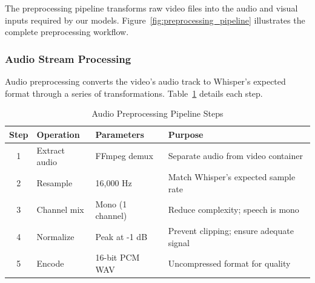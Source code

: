 The preprocessing pipeline transforms raw video files into the audio and visual inputs required by our models. Figure~\ref{fig:preprocessing_pipeline} illustrates the complete preprocessing workflow.

%
%

\subsubsection{Audio Stream Processing}

Audio preprocessing converts the video's audio track to Whisper's expected format through a series of transformations. Table~\ref{tab:audio_preprocessing} details each step.

\begin{table}[h]
\centering
\caption{Audio Preprocessing Pipeline Steps}
\label{tab:audio_preprocessing}
\begin{tabular}{|c|l|p{4cm}|p{4.5cm}|}
\hline
\textbf{Step} & \textbf{Operation} & \textbf{Parameters} & \textbf{Purpose} \\
\hline
1 & Extract audio & FFmpeg demux & Separate audio from video container \\
\hline
2 & Resample & 16,000 Hz & Match Whisper's expected sample rate \\
\hline
3 & Channel mix & Mono (1 channel) & Reduce complexity; speech is mono \\
\hline
4 & Normalize & Peak at -1 dB & Prevent clipping; ensure adequate signal \\
\hline
5 & Encode & 16-bit PCM WAV & Uncompressed format for quality \\
\hline
\end{tabular}
\end{table}

